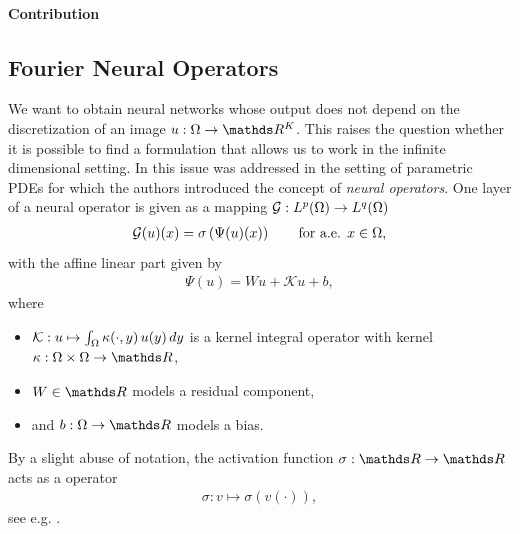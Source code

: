 \paragraph{Contribution}
%
%

%
%
\subsection{Fourier Neural Operators}
%
%
We want to obtain neural networks whose output does not depend on the discretization of an image $\img:\domain\to\R^K$. This raises the question whether it is possible to find a formulation that allows us to work in the infinite dimensional setting. In \cite{kovachki2021neural} this issue was addressed in the setting of parametric PDEs for which the authors introduced the concept of \emph{neural operators}. One layer of a neural operator is given as a mapping $\mathcal{G}:  L^p(\Omega) \rightarrow L^q(\Omega)$
%
\begin{align}\label{eq:layerdef}
\mathcal{G}(u)(x) = \sigma\left(\Psi(u)(x)\right) \qquad \text{for a.e. } x \in \Omega,
\end{align}
%
with the affine linear part given by
%
\begin{align}\label{eq:linearpart}
\Psi(u) = W u + \mathcal{K}u + b,
\end{align}
%
where
%
\begin{itemize}
\item $\mathcal{K}: u \mapsto \int_{\Omega} \kappa(\cdot, y)\, u(y)\,dy$ is a kernel integral operator with kernel $\kappa: \domain \times \domain \rightarrow \R$,
\item $W \in \R$ models a residual component,
\item and $b: \domain \rightarrow \R$ models a bias.
\end{itemize}
%
%
By a slight abuse of notation, the activation function $\sigma:\R\to\R$ acts as a \Nem operator
%
\begin{align}\label{eq:nemytskii}%
\sigma: v \mapsto \sigma(v(\cdot)),
\end{align}
%
see e.g. \cite{tröltzsch}.

